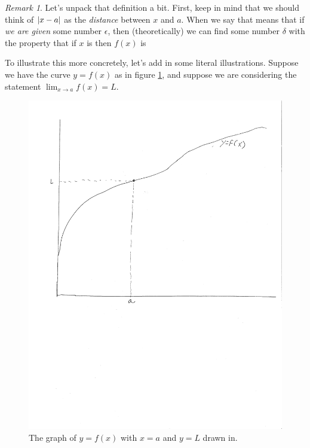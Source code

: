 \documentclass[english]{book}
\DeclarePairedDelimiter\abs{\lvert}{\rvert}%
\theoremstyle{remark}
\newtheorem{remark}{Remark}[theorem]
\theoremstyle{definition}
\newtheorem*{next week}{Next Week}
\begin{document}
\begin{remark}
Let's unpack that definition a bit. First, keep in mind that we should think of $\abs{x-a}$ as the \emph{distance} between $x$ and $a$. When we say  that means that if \emph{we are given} some number $\epsilon$, then (theoretically) we can find some number $\delta$ with the property that if $x$ is  then $f(x)$ is  

To illustrate this more concretely, let's add in some literal illustrations. Suppose we have the curve $y=f(x)$ as in figure \ref{fig:1graph1}, and suppose we are considering the statement $\displaystyle\lim_{x\to a} f(x)=L$.
\begin{figure}[h!]\centering
\includegraphics[scale=0.5,trim={0 4in 10mm 0},clip]{1graph1} \caption{The graph of $y=f(x)$ with $x=a$ and $y=L$ drawn in.\label{fig:1graph1}}
\end{figure}


\end{remark}
\end{document}
